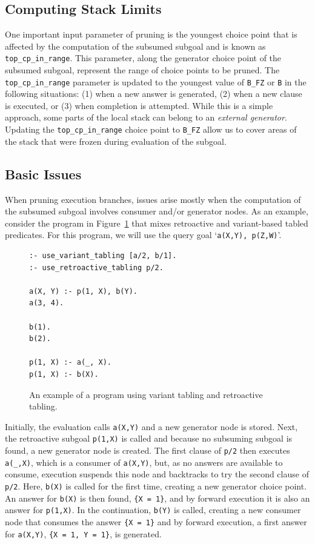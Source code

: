 \subsection{Computing Stack Limits}

One important input parameter of pruning is the youngest choice point that is affected
by the computation of the subsumed subgoal and is known as \texttt{top\_cp\_in\_range}.
This parameter, along the generator choice point of the subsumed subgoal, represent the
range of choice points to be pruned.
The \texttt{top\_cp\_in\_range} parameter is updated to the youngest value of \texttt{B\_FZ}
or \texttt{B} in the following situations:
(1) when a new answer is generated, (2) when a new clause is executed, or (3) when completion
is attempted. While this is a simple approach, some parts of the local stack can belong to an
\textit{external generator}. Updating the \texttt{top\_cp\_in\_range} choice point to
\texttt{B\_FZ} allow us to cover areas of the stack that were frozen during evaluation of the subgoal.

\subsection{Basic Issues}

When pruning execution branches, issues arise mostly when the computation of the subsumed subgoal
involves consumer and/or generator nodes. As an example, consider the program in Figure~\ref{fig:retro_program2}
that mixes retroactive and variant-based tabled predicates. For this program, we will use the query goal
`\texttt{a(X,Y),~p(Z,W)}'.

\begin{figure}[ht]
\begin{Verbatim}
:- use_variant_tabling [a/2, b/1].
:- use_retroactive_tabling p/2.

a(X, Y) :- p(1, X), b(Y).
a(3, 4).

b(1).
b(2).

p(1, X) :- a(_, X).
p(1, X) :- b(X).
\end{Verbatim}
\caption{An example of a program using variant tabling and retroactive tabling.}
\label{fig:retro_program2}
\end{figure}

Initially, the evaluation calls \texttt{a(X,Y)} and a new generator node is stored. Next, the retroactive subgoal
\texttt{p(1,X)} is called and because no subsuming subgoal is found, a new generator node is created.
The first clause of \texttt{p/2} then executes \texttt{a(\_,X)}, which is a consumer of \texttt{a(X,Y)}, but, as
no answers are available to consume, execution suspends this node and backtracks to try the second clause
of \texttt{p/2}. Here, \texttt{b(X)} is called for the first time, creating a new generator choice point.
An answer for \texttt{b(X)} is then found, \texttt{\{X~=~1\}}, and by forward execution it is also an answer
for \texttt{p(1,X)}. In the continuation, \texttt{b(Y)} is called, creating a new consumer node that consumes the answer
\texttt{\{X~=~1\}} and by forward execution, a first answer for \texttt{a(X,Y)}, \texttt{\{X~=~1,~Y~=~1\}},
is generated.


